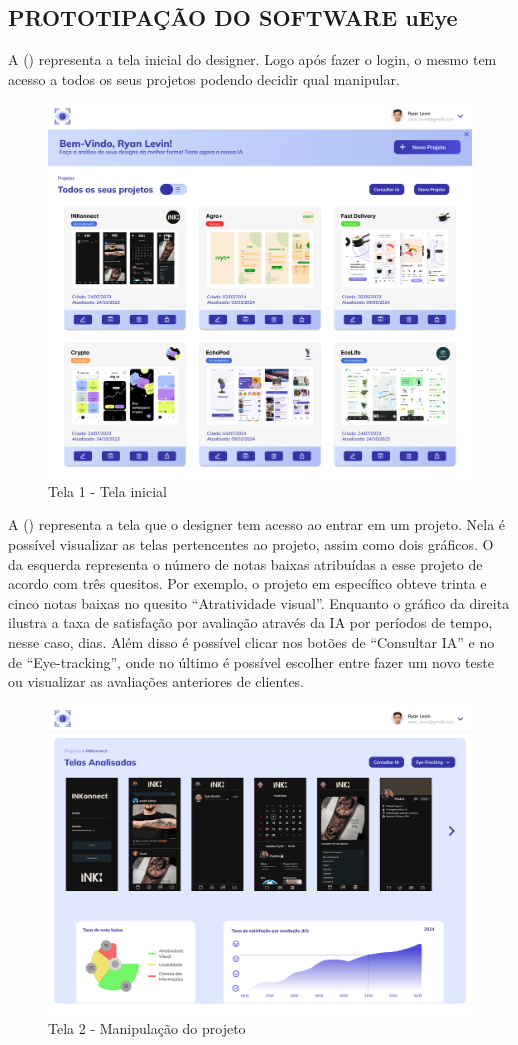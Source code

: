 \subsection*{PROTOTIPAÇÃO DO SOFTWARE uEye}
A () representa a tela inicial do designer. Logo após fazer o login, o mesmo tem acesso a todos os seus projetos podendo decidir qual manipular.

\begin{figure}[H]
    \centering
    \caption{Tela 1 - Tela inicial}%
    \label{fig:pg-tela1}
    \includegraphics[width=0.72\linewidth]{Illustrations/tela1.png}
\end{figure}

A () representa a tela que o designer tem acesso ao entrar em um projeto. Nela é possível visualizar as telas pertencentes ao projeto, assim como dois gráficos. O da esquerda representa o número de notas baixas atribuídas a esse projeto de acordo com três quesitos. Por exemplo, o projeto em específico obteve trinta e cinco notas baixas no quesito “Atratividade visual”. Enquanto o gráfico da direita ilustra a taxa de satisfação por avaliação através da IA por períodos de tempo, nesse caso, dias. Além disso é possível clicar nos botões de “Consultar IA” e no de “Eye-tracking”, onde no último é possível escolher entre fazer um novo teste ou visualizar as avaliações anteriores de clientes.

\begin{figure}[H]
    \centering
    \caption{Tela 2 - Manipulação do projeto}%
    \label{fig:pg-tela2}
    \includegraphics[width=0.72\linewidth]{Illustrations/tela2.png}
\end{figure}

